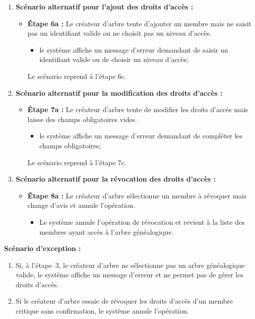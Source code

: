 \begin{enumerate}
    \item \textbf{Scénario alternatif pour l'ajout des droits d'accès :}
    \begin{itemize}
        \item \textbf{Étape 6a :} Le créateur d'arbre tente d'ajouter un membre
          mais ne saisit pas un identifiant valide ou ne choisit pas un niveau d'accès.
        \begin{itemize}
            \item le système affiche un message d'erreur demandant de saisir un
              identifiant valide ou de choisir un niveau d'accès;
        \end{itemize}
        Le scénario reprend à l'étape 6c.
    \end{itemize}

    \item \textbf{Scénario alternatif pour la modification des droits d'accès :}
    \begin{itemize}
        \item \textbf{Étape 7a :} Le créateur d'arbre tente de modifier les droits
          d'accès mais laisse des champs obligatoires vides.
        \begin{itemize}
            \item le système affiche un message d'erreur demandant de compléter les champs obligatoires;
        \end{itemize}
        Le scénario reprend à l'étape 7c.
    \end{itemize}

    \item \textbf{Scénario alternatif pour la révocation des droits d'accès :}
    \begin{itemize}
        \item \textbf{Étape 8a :} Le créateur d'arbre sélectionne un membre à
          révoquer mais change d'avis et annule l'opération.
        \begin{itemize}
            \item Le système annule l'opération de révocation et revient à la
              liste des membres ayant accès à l'arbre généalogique.
        \end{itemize}
    \end{itemize}

\end{enumerate}

\textbf{Scénario d'exception :}
\begin{enumerate}
  \item Si, à l’étape 3, le créateur d'arbre ne sélectionne pas un arbre généalogique
    valide, le système affiche un message d'erreur et ne permet pas de gérer les droits d'accès.

  \item Si le créateur d'arbre essaie de révoquer les droits d'accès d'un membre
    critique sans confirmation, le système annule l'opération.
\end{enumerate}

